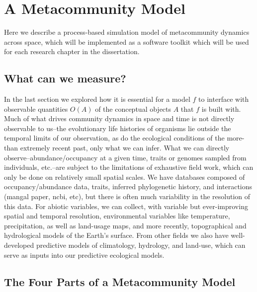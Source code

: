 \documentclass[]{article}
\begin{document}
\hypertarget{a-metacommunity-model}{%
\section{A Metacommunity Model}\label{a-metacommunity-model}}

Here we describe a process-based simulation model of metacommunity
dynamics across space, which will be implemented as a software toolkit
which will be used for each research chapter in the dissertation.


\hypertarget{what-can-we-measure}{%
\subsection{What can we measure?}\label{what-can-we-measure}}

In the last section we explored how it is essential for a model \(f\) to
interface with observable quantities \(O(A)\) of the conceptual objects
\(A\) that \(f\) is built with. Much of what drives community dynamics
in space and time is not directly observable to us--the evolutionary
life histories of organisms lie outside the temporal limits of our
observation, as do the ecological conditions of the more-than extremely
recent past, only what we can infer. What we can directly
observe--abundance/occupancy at a given time, traits or genomes sampled
from individuals, etc.--are subject to the limitations of exhaustive
field work, which can only be done on relatively small spatial scales.
We have databases composed of occupancy/abundance data, traits, inferred
phylogenetic history, and interactions (mangal paper, ncbi, etc), but
there is often much variability in the resolution of this data. For
abiotic variables, we can collect, with variable but ever-improving
spatial and temporal resolution, environmental variables like
temperature, precipitation, as well as land-usage maps, and more
recently, topographical and hydrological models of the Earth's surface.
From other fields we also have well-developed predictive models of
climatology, hydrology, and land-use, which can serve as inputs into our
predictive ecological models.



\hypertarget{the-four-parts-of-a-metacommunity-model}{%
\subsection{The Four Parts of a Metacommunity
Model}\label{the-four-parts-of-a-metacommunity-model}}
\end{document}
